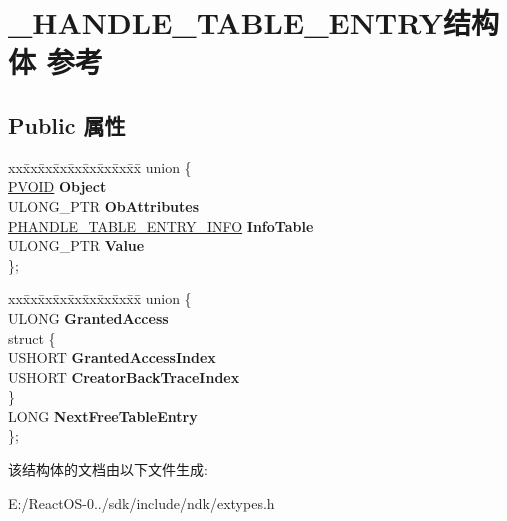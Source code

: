 \hypertarget{struct___h_a_n_d_l_e___t_a_b_l_e___e_n_t_r_y}{}\section{\+\_\+\+H\+A\+N\+D\+L\+E\+\_\+\+T\+A\+B\+L\+E\+\_\+\+E\+N\+T\+R\+Y结构体 参考}
\label{struct___h_a_n_d_l_e___t_a_b_l_e___e_n_t_r_y}
\subsection*{Public 属性}
\begin{DoxyCompactItemize}
\item 
\mbox{\label{struct___h_a_n_d_l_e___t_a_b_l_e___e_n_t_r_y_ac763f0290e94f9b8da310cb18a8eb277}} 
\begin{tabbing}
xx\=xx\=xx\=xx\=xx\=xx\=xx\=xx\=xx\=\kill
union \{\\
\>\hyperlink{interfacevoid}{PVOID} {\bfseries Object}\\
\>ULONG\_PTR {\bfseries ObAttributes}\\
\>\hyperlink{struct___h_a_n_d_l_e___t_a_b_l_e___e_n_t_r_y___i_n_f_o}{PHANDLE\_TABLE\_ENTRY\_INFO} {\bfseries InfoTable}\\
\>ULONG\_PTR {\bfseries Value}\\
\}; \\

\end{tabbing}\item 
\mbox{\label{struct___h_a_n_d_l_e___t_a_b_l_e___e_n_t_r_y_af059538b81163126b95e6512baa7e62f}} 
\begin{tabbing}
xx\=xx\=xx\=xx\=xx\=xx\=xx\=xx\=xx\=\kill
union \{\\
\>ULONG {\bfseries GrantedAccess}\\
\mbox{\label{union___h_a_n_d_l_e___t_a_b_l_e___e_n_t_r_y_1_1_0D2002_af222703c6deec2f5e07a64507d2aa323}} 
\>struct \{\\
\>\>USHORT {\bfseries GrantedAccessIndex}\\
\>\>USHORT {\bfseries CreatorBackTraceIndex}\\
\>\} \\
\>LONG {\bfseries NextFreeTableEntry}\\
\}; \\

\end{tabbing}\end{DoxyCompactItemize}


该结构体的文档由以下文件生成\+:\begin{DoxyCompactItemize}
\item 
E\+:/\+React\+O\+S-\/0../sdk/include/ndk/extypes.\+h\end{DoxyCompactItemize}
